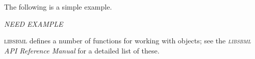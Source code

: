 \documentclass{cekmanual}
\newcommand{\libsbml}{\textsc{libsbml}}
\begin{document}
The following is a simple example.  

\emph{NEED EXAMPLE}


\libsbml{} defines a number of functions for working with
 objects; see the \emph{\libsbml{} API Reference Manual}
for a detailed list of these.








\clearpage



\end{document}
